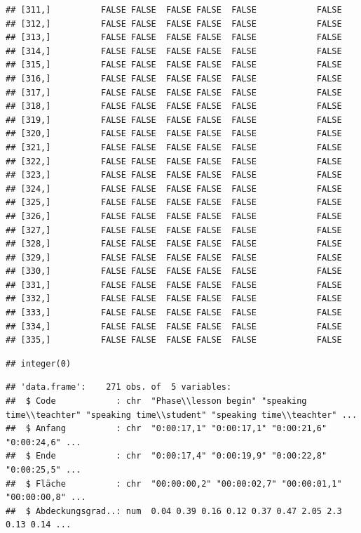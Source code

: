 \documentclass[
  english,
  man,floatsintext]{apa6}
\begin{document}
\begin{verbatim}
## [311,]          FALSE FALSE  FALSE FALSE  FALSE            FALSE
## [312,]          FALSE FALSE  FALSE FALSE  FALSE            FALSE
## [313,]          FALSE FALSE  FALSE FALSE  FALSE            FALSE
## [314,]          FALSE FALSE  FALSE FALSE  FALSE            FALSE
## [315,]          FALSE FALSE  FALSE FALSE  FALSE            FALSE
## [316,]          FALSE FALSE  FALSE FALSE  FALSE            FALSE
## [317,]          FALSE FALSE  FALSE FALSE  FALSE            FALSE
## [318,]          FALSE FALSE  FALSE FALSE  FALSE            FALSE
## [319,]          FALSE FALSE  FALSE FALSE  FALSE            FALSE
## [320,]          FALSE FALSE  FALSE FALSE  FALSE            FALSE
## [321,]          FALSE FALSE  FALSE FALSE  FALSE            FALSE
## [322,]          FALSE FALSE  FALSE FALSE  FALSE            FALSE
## [323,]          FALSE FALSE  FALSE FALSE  FALSE            FALSE
## [324,]          FALSE FALSE  FALSE FALSE  FALSE            FALSE
## [325,]          FALSE FALSE  FALSE FALSE  FALSE            FALSE
## [326,]          FALSE FALSE  FALSE FALSE  FALSE            FALSE
## [327,]          FALSE FALSE  FALSE FALSE  FALSE            FALSE
## [328,]          FALSE FALSE  FALSE FALSE  FALSE            FALSE
## [329,]          FALSE FALSE  FALSE FALSE  FALSE            FALSE
## [330,]          FALSE FALSE  FALSE FALSE  FALSE            FALSE
## [331,]          FALSE FALSE  FALSE FALSE  FALSE            FALSE
## [332,]          FALSE FALSE  FALSE FALSE  FALSE            FALSE
## [333,]          FALSE FALSE  FALSE FALSE  FALSE            FALSE
## [334,]          FALSE FALSE  FALSE FALSE  FALSE            FALSE
## [335,]          FALSE FALSE  FALSE FALSE  FALSE            FALSE
\end{verbatim}

\begin{verbatim}
## integer(0)
\end{verbatim}

\begin{verbatim}
## 'data.frame':    271 obs. of  5 variables:
##  $ Code            : chr  "Phase\\lesson begin" "speaking time\\teachter" "speaking time\\student" "speaking time\\teachter" ...
##  $ Anfang          : chr  "0:00:17,1" "0:00:17,1" "0:00:21,6" "0:00:24,6" ...
##  $ Ende            : chr  "0:00:17,4" "0:00:19,9" "0:00:22,8" "0:00:25,5" ...
##  $ Fläche          : chr  "00:00:00,2" "00:00:02,7" "00:00:01,1" "00:00:00,8" ...
##  $ Abdeckungsgrad..: num  0.04 0.39 0.16 0.12 0.37 0.47 2.05 2.3 0.13 0.14 ...
\end{verbatim}
\end{document}
